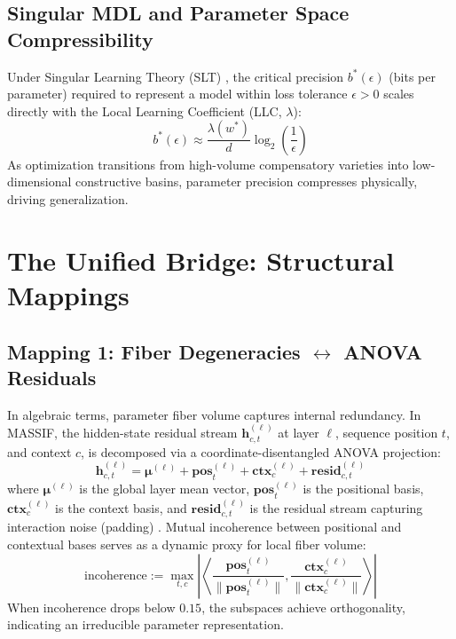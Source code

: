 \documentclass[11pt]{article}
\begin{document}
\subsection{Singular MDL and Parameter Space Compressibility}
Under Singular Learning Theory (SLT) \cite{slt, smdl}, the critical precision $b^*(\epsilon)$ (bits per parameter) required to represent a model within loss tolerance $\epsilon > 0$ scales directly with the Local Learning Coefficient (LLC, $\lambda$):
\begin{equation}
b^*(\epsilon) \approx \frac{\lambda(w^*)}{d} \log_2 \left( \frac{1}{\epsilon} \right)
\end{equation}
As optimization transitions from high-volume compensatory varieties into low-dimensional constructive basins, parameter precision compresses physically, driving generalization.

\section{The Unified Bridge: Structural Mappings}

\subsection{Mapping 1: Fiber Degeneracies \texorpdfstring{$\leftrightarrow$}{<=>} ANOVA Residuals}
In algebraic terms, parameter fiber volume captures internal redundancy. In MASSIF, the hidden-state residual stream $\mathbf{h}_{c,t}^{(\ell)}$ at layer $\ell$, sequence position $t$, and context $c$, is decomposed via a coordinate-disentangled ANOVA projection:
\begin{equation}
\mathbf{h}_{c,t}^{(\ell)} = \boldsymbol{\mu}^{(\ell)} + \mathbf{pos}_t^{(\ell)} + \mathbf{ctx}_c^{(\ell)} + \mathbf{resid}_{c,t}^{(\ell)}
\end{equation}
where $\boldsymbol{\mu}^{(\ell)}$ is the global layer mean vector, $\mathbf{pos}_t^{(\ell)}$ is the positional basis, $\mathbf{ctx}_c^{(\ell)}$ is the context basis, and $\mathbf{resid}_{c,t}^{(\ell)}$ is the residual stream capturing interaction noise (padding) \cite{massif}. Mutual incoherence between positional and contextual bases serves as a dynamic proxy for local fiber volume:
\begin{equation}
\text{incoherence} := \max_{t,c} \left| \left\langle \frac{\mathbf{pos}_t^{(\ell)}}{\|\mathbf{pos}_t^{(\ell)}\|}, \frac{\mathbf{ctx}_c^{(\ell)}}{\|\mathbf{ctx}_c^{(\ell)}\|} \right\rangle \right|
\end{equation}
When incoherence drops below $0.15$, the subspaces achieve orthogonality, indicating an irreducible parameter representation.
\end{document}
